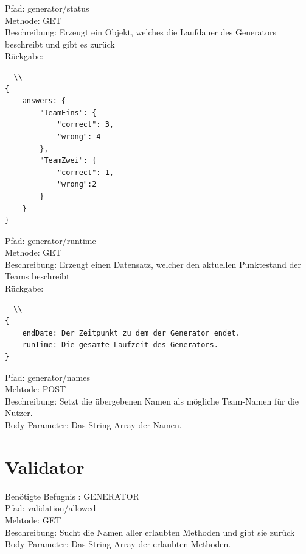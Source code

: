 \noindent Pfad: generator/status \\
Methode: GET \\
Beschreibung: Erzeugt ein Objekt, welches die Laufdauer des Generators beschreibt und gibt es zurück  \\
Rückgabe:
\begin{lstlisting}  \\
{
	answers: {
		"TeamEins": {
			"correct": 3,
			"wrong": 4
		},
		"TeamZwei": {
			"correct": 1,
			"wrong":2
		}
	}
}
\end{lstlisting}

\noindent Pfad: generator/runtime \\
Methode: GET \\
Beschreibung: Erzeugt einen Datensatz, welcher den aktuellen Punktestand der Teams beschreibt  \\
Rückgabe:
\begin{lstlisting}  \\
{
	endDate: Der Zeitpunkt zu dem der Generator endet.
	runTime: Die gesamte Laufzeit des Generators.
}
\end{lstlisting}

\noindent Pfad: generator/names \\
Mehtode: POST \\
Beschreibung: Setzt die übergebenen Namen als mögliche Team-Namen für die Nutzer.\\
Body-Parameter: Das String-Array der Namen. \\


\section{Validator}

Benötigte Befugnis : GENERATOR \\

\noindent Pfad: validation/allowed\\
Mehtode: GET \\
Beschreibung: Sucht die Namen aller erlaubten Methoden und gibt sie zurück\\
Body-Parameter: Das String-Array der erlaubten Methoden. \\



